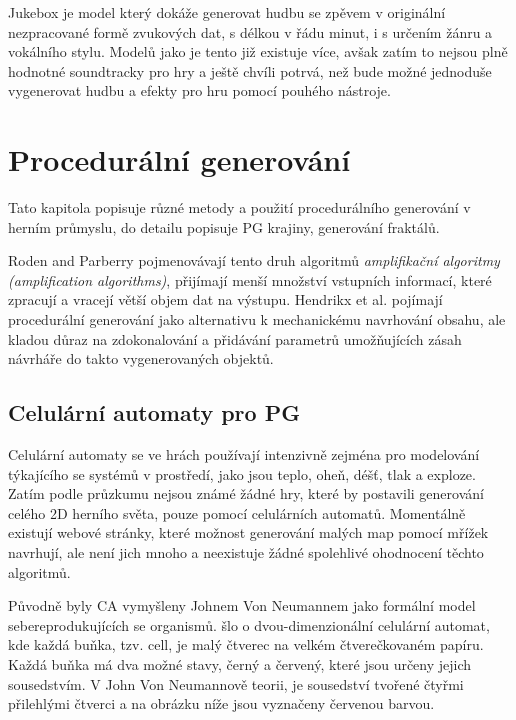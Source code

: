 Jukebox \cite{Dhariwal2020JukeboxAG} je model který dokáže generovat hudbu se zpěvem v originální nezpracované formě zvukových dat, s délkou v řádu minut, i s určením žánru a vokálního stylu. Modelů jako je tento již existuje více, avšak zatím to nejsou plně hodnotné soundtracky pro hry a ještě chvíli potrvá, než bude možné jednoduše vygenerovat hudbu a efekty pro hru pomocí pouhého nástroje.

\pagebreak

\chapter{Procedurální generování}
Tato kapitola popisuje různé metody a použití procedurálního generování v herním průmyslu, do detailu popisuje PG krajiny, generování fraktálů.

Roden and Parberry \cite{FromArtistry} pojmenovávají tento druh algoritmů \textit{amplifikační algoritmy (amplification algorithms)}, přijímají menší množství vstupních informací, které zpracují a vracejí větší objem dat na výstupu. Hendrikx et al. \cite{Hendrikx} pojímají procedurální generování jako alternativu k mechanickému navrhování obsahu, ale kladou důraz na zdokonalování a přidávání parametrů umožňujících zásah návrháře do takto vygenerovaných objektů.

\section{Celulární automaty pro PG}
\label{celular}
Celulární automaty se ve hrách používají intenzivně zejména pro modelování týkajícího se systémů v prostředí, jako jsou teplo, oheň, déšť, tlak a exploze. Zatím podle průzkumu nejsou známé žádné hry, které by postavili generování celého 2D herního světa, pouze pomocí celulárních automatů. Momentálně existují webové stránky, které možnost generování malých map pomocí mřížek navrhují, ale není jich mnoho a neexistuje žádné spolehlivé ohodnocení těchto algoritmů. \cite{articleCellular}

Původně byly CA vymyšleny Johnem Von Neumannem jako formální model sebereprodukujících se organismů. šlo o dvou-dimenzionální celulární automat, kde každá buňka, tzv. cell, je malý čtverec na velkém čtverečkovaném papíru. Každá buňka má dva možné stavy, černý a červený, které jsou určeny jejich sousedstvím. V John Von Neumannově teorii, je sousedství tvořené čtyřmi přilehlými čtverci a na obrázku níže jsou vyznačeny červenou barvou. \cite{Gong2017}

